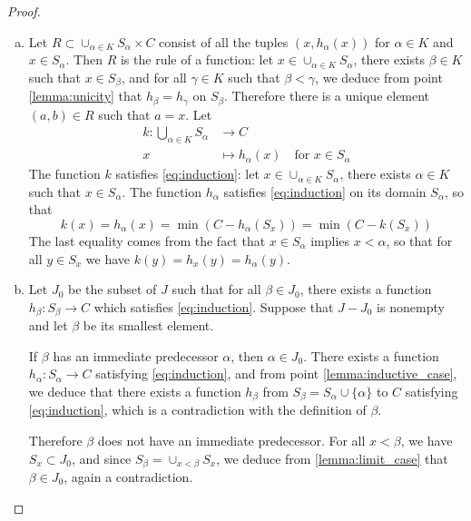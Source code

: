 \documentclass[11pt,a4paper,twoside]{article}
\theoremstyle{definition}
\theoremstyle{plain}
\begin{document}
\begin{proof}
\begin{enumerate}[(a)]
  \item \label{lemma:limit_case}
    Let $R \subset \cup_{\alpha \in K} S_\alpha \times C$ consist of all the tuples $\left( x, h_\alpha ( x ) \right)$
    for $\alpha \in K$ and $x \in S_\alpha$. Then $R$ is the rule of a function: let $x \in \cup_{\alpha \in K} S_\alpha$, there
    exists $\beta \in K$ such that $x \in S_\beta$, and for all $\gamma \in K$ such that $\beta < \gamma$,
    we deduce from point \ref{lemma:unicity} that $h_\beta = h_\gamma$ on $S_\beta$. Therefore there is a unique element $(a, b) \in R$
    such that $a = x$. Let
    \begin{align*}
      k : \bigcup_{\alpha \in K} S_\alpha &\to C \\
      x &\mapsto h_\alpha ( x ) \quad\text{for } x \in S_\alpha
    \end{align*}
    The function $k$ satisfies \eqref{eq:induction}: let $x \in \cup_{\alpha \in K} S_\alpha$, there exists $\alpha \in K$ such that
    $x \in S_\alpha$. The function $h_\alpha$ satisfies \eqref{eq:induction} on its domain $S_\alpha$, so that
    \begin{equation*}
      k ( x ) = h_\alpha ( x )= \min \left( C - h_\alpha \left( S_x \right) \right) = \min \left( C - k \left( S_x \right) \right)
    \end{equation*}
    The last equality comes from the fact that $x \in S_\alpha$ implies $x < \alpha$, so that for all $y \in S_x$ we have
    $k ( y ) = h_x ( y ) = h_\alpha ( y )$.

  \item \label{lemma:transfinite_induction}
    Let $J_0$ be the subset of $J$ such that for all $\beta \in J_0$, there exists a function $h_\beta : S_\beta \to C$
    which satisfies \eqref{eq:induction}.
    Suppose that $J - J_0$ is nonempty and let $\beta$ be its smallest element.

    If $\beta$ has an immediate predecessor $\alpha$, then $\alpha \in J_0$. There exists a function $h_\alpha : S_\alpha \to C$
    satisfying \eqref{eq:induction}, and from point \ref{lemma:inductive_case}, we deduce that there exists a function $h_\beta$
    from $S_\beta = S_\alpha \cup \{ \alpha \}$ to $C$ satisfying \eqref{eq:induction}, which is a contradiction with the definition
    of $\beta$.

    Therefore $\beta$ does not have an immediate predecessor. For all $x < \beta$, we have $S_x \subset J_0$, and since
    $S_\beta = \cup_{x < \beta} S_x$, we deduce from \ref{lemma:limit_case} that $\beta \in J_0$, again a contradiction.


\end{enumerate}
\end{proof}
\end{document}
